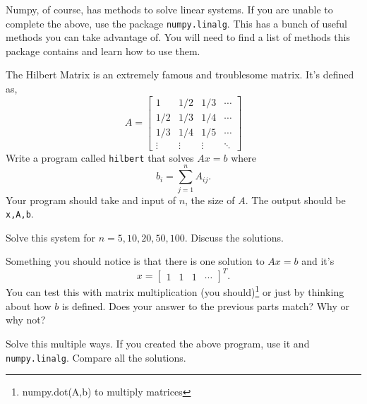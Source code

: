 \documentclass[11pt,letterpaper]{article}
\begin{document}
Numpy, of course, has methods to solve linear systems. If you are unable to complete the above, 
use the package \texttt{numpy.linalg}. This has a bunch of useful methods you can take advantage
of. You will need to find a list of methods this package contains and learn how to use them.

\begin{problem}
The Hilbert Matrix is an extremely famous and troublesome matrix. It's defined as,
\[
 A = \begin{bmatrix}
1 & 1/2 & 1/3 & \cdots \\
1/2 & 1/3 & 1/4 & \cdots \\
1/3 & 1/4 & 1/5 & \cdots \\
\vdots & \vdots & \vdots & \ddots
\end{bmatrix}
\]
Write a program called \texttt{hilbert} that solves $Ax=b$ where
\[
b_i = \sum_{j=1}^n A_{ij}.
\]
Your program should take and input of $n$, the size of $A$. The output should be 
\texttt{x,A,b}.

Solve this system for $n=5,10,20,50,100$. Discuss the solutions.

Something you should notice is that there is one solution to $Ax=b$ and it's
\[
x = \begin{bmatrix} 1 & 1 & 1 & \cdots \end{bmatrix}^T.
\]
You can test this with matrix multiplication (you should)\footnote{numpy.dot(A,b) to multiply matrices} or just by thinking about how $b$ is defined. Does your answer to the previous parts match? Why or why not?

Solve this multiple ways. If you created the above program, use it and \texttt{numpy.linalg}. 
Compare all the solutions.


\end{problem}
\end{document}
